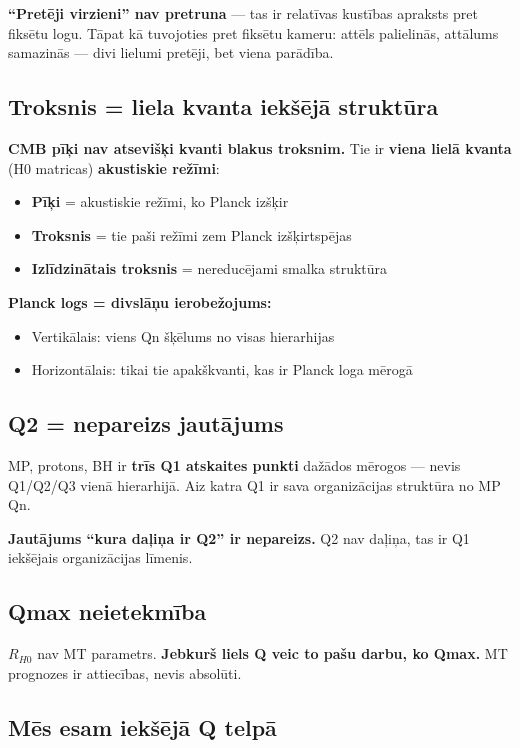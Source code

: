 \documentclass[12pt,a4paper]{article}
\begin{document}
\textbf{``Pretēji virzieni'' nav pretruna} — tas ir relatīvas kustības apraksts pret fiksētu logu. Tāpat kā tuvojoties pret fiksētu kameru: attēls palielinās, attālums samazinās — divi lielumi pretēji, bet viena parādība.

\subsection*{Troksnis = liela kvanta iekšējā struktūra}

\textbf{CMB pīķi nav atsevišķi kvanti blakus troksnim.} Tie ir \textbf{viena lielā kvanta} (H0 matricas) \textbf{akustiskie režīmi}:
\begin{itemize}
    \item \textbf{Pīķi} = akustiskie režīmi, ko Planck izšķir
    \item \textbf{Troksnis} = tie paši režīmi zem Planck izšķirtspējas
    \item \textbf{Izlīdzinātais troksnis} = nereducējami smalka struktūra
\end{itemize}

\textbf{Planck logs = divslāņu ierobežojums:}
\begin{itemize}
    \item Vertikālais: viens Qn šķēlums no visas hierarhijas
    \item Horizontālais: tikai tie apakškvanti, kas ir Planck loga mērogā
\end{itemize}

\subsection*{Q2 = nepareizs jautājums}

MP, protons, BH ir \textbf{trīs Q1 atskaites punkti} dažādos mērogos — nevis Q1/Q2/Q3 vienā hierarhijā. Aiz katra Q1 ir sava organizācijas struktūra no MP Qn.

\textbf{Jautājums ``kura daļiņa ir Q2'' ir nepareizs.} Q2 nav daļiņa, tas ir Q1 iekšējais organizācijas līmenis.

\subsection*{Qmax neietekmība}

$R_{H0}$ nav MT parametrs. \textbf{Jebkurš liels Q veic to pašu darbu, ko Qmax.} MT prognozes ir attiecības, nevis absolūti.

\subsection*{Mēs esam iekšējā Q telpā}
\end{document}
